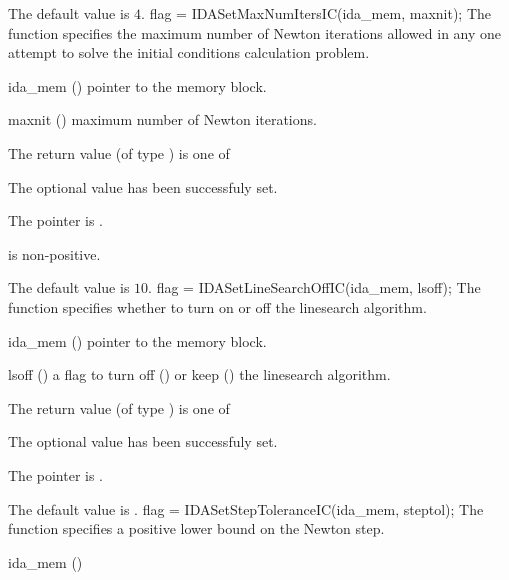 {{\begin{args}
  \end{args}
}
{
  The default value is $4$.
}
{
flag = IDASetMaxNumItersIC(ida\_mem, maxnit);
}
{
  The function  specifies the maximum
  number of Newton iterations allowed in any one attempt to solve
  the initial conditions calculation problem.
}
{
  \begin{args}
  \item[ida\_mem] ()
    pointer to the {\ida} memory block.
  \item[maxnit] ()
    maximum number of Newton iterations.
  \end{args}
}
{
  The return value  (of type ) is one of
  \begin{args}
  \item[\Id{IDA\_SUCCESS}] 
    The optional value has been successfuly set.
  \item[\Id{IDA\_MEM\_NULL}]
    The  pointer is .
  \item[\Id{IDA\_ILL\_INPUT}]
     is non-positive.
  \end{args}
}
{
  The default value is $10$.
}
{
flag = IDASetLineSearchOffIC(ida\_mem, lsoff);
}
{
  The function  specifies whether to turn
  on or off the linesearch algorithm.
}
{
  \begin{args}
  \item[ida\_mem] ()
    pointer to the {\ida} memory block.
  \item[lsoff] ()
    a flag to turn off () or keep () the linesearch
    algorithm.
  \end{args}
}
{
  The return value  (of type ) is one of
  \begin{args}
  \item[\Id{IDA\_SUCCESS}] 
    The optional value has been successfuly set.
  \item[\Id{IDA\_MEM\_NULL}]
    The  pointer is .
  \end{args}
}
{
  The default value is .
}
{
flag = IDASetStepToleranceIC(ida\_mem, steptol);
}
{
  The function  specifies a positive lower bound
  on the Newton step.
}
{
  \begin{args}
  \item[ida\_mem] ()

\end{args}}}

